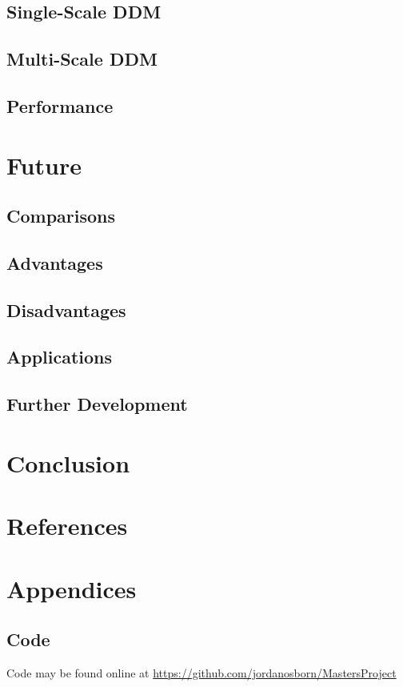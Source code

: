 \documentclass[11pt]{article}
\begin{document}
\subsection{Single-Scale DDM}
\subsection{Multi-Scale DDM}
\subsection{Performance}

\clearpage
\section{Future}
\subsection{Comparisons}
\subsection{Advantages}
\subsection{Disadvantages}
\subsection{Applications}
\subsection{Further Development}

\clearpage
\section{Conclusion}


\clearpage
\section{References}
\printbibliography[heading=none]

\clearpage
\section{Appendices}
\subsection{Code}
Code may be found online at \url{https://github.com/jordanosborn/MastersProject}
\end{document}
